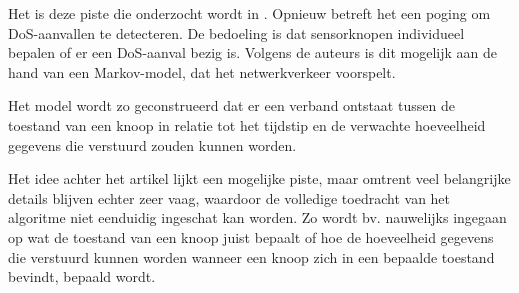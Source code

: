Het is deze piste die onderzocht wordt in \citep{zhijie2012intrusion}. Opnieuw
betreft het een poging om DoS-aanvallen te detecteren. De bedoeling is dat
sensorknopen individueel bepalen of er een DoS-aanval bezig is. Volgens de
auteurs is dit mogelijk aan de hand van een Markov-model, dat het
netwerkverkeer voorspelt.

Het model wordt zo geconstrueerd dat er een verband ontstaat tussen de toestand
van een knoop in relatie tot het tijdstip en de verwachte hoeveelheid gegevens
die verstuurd zouden kunnen worden.

Het idee achter het artikel lijkt een mogelijke piste, maar omtrent veel
belangrijke details blijven echter zeer vaag, waardoor de volledige toedracht
van het algoritme niet eenduidig ingeschat kan worden. Zo wordt bv. nauwelijks
ingegaan op wat de toestand van een knoop juist bepaalt of hoe de
hoeveelheid gegevens die verstuurd kunnen worden wanneer een knoop zich in een
bepaalde toestand bevindt, bepaald wordt.
